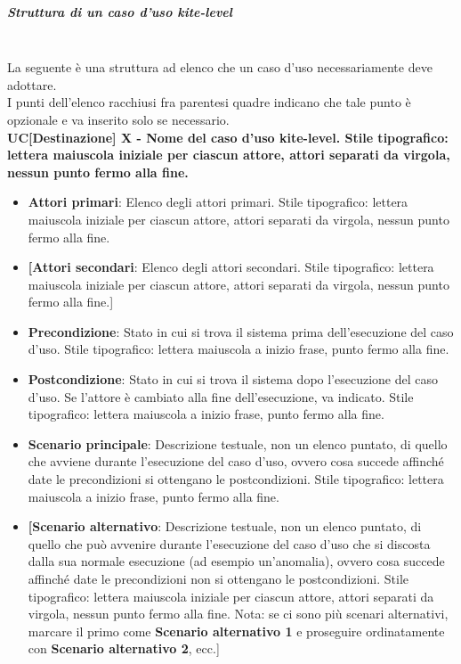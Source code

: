 \subparagraph*{Struttura di un caso d'uso kite-level}\mbox{}\\
La seguente è una struttura ad elenco che un caso d'uso  necessariamente deve adottare.\\
I punti dell'elenco racchiusi fra parentesi quadre indicano che tale punto è opzionale e va inserito solo se necessario.\\
\textbf{UC[Destinazione] X - Nome del caso d'uso kite-level. Stile tipografico: lettera maiuscola iniziale per ciascun attore, attori separati da virgola, nessun punto fermo alla fine.} %
\begin{itemize}
	\item \textbf{Attori primari}: Elenco degli attori primari.
	Stile tipografico: lettera maiuscola iniziale per ciascun attore, attori separati da virgola, nessun punto fermo alla fine.
	\item \textbf{[Attori secondari}: Elenco degli attori secondari.
	Stile tipografico: lettera maiuscola iniziale per ciascun attore, attori separati da virgola, nessun punto fermo alla fine.]
	\item \textbf{Precondizione}: Stato in cui si trova il sistema prima dell'esecuzione del caso d'uso.
	Stile tipografico: lettera maiuscola a inizio frase, punto fermo alla fine.
	\item \textbf{Postcondizione}: Stato in cui si trova il sistema dopo l'esecuzione del caso d'uso.
	Se l'attore è cambiato alla fine dell'esecuzione, va indicato.
	Stile tipografico: lettera maiuscola a inizio frase, punto fermo alla fine.
	\item \textbf{Scenario principale}: Descrizione testuale, non un elenco puntato, di quello che avviene durante l'esecuzione del caso d'uso, ovvero cosa succede affinché date le precondizioni si ottengano le postcondizioni.
	Stile tipografico: lettera maiuscola a inizio frase, punto fermo alla fine.
	\item \textbf{[Scenario alternativo}: Descrizione testuale, non un elenco puntato, di quello che può avvenire durante l'esecuzione del caso d'uso che si discosta dalla sua normale esecuzione (ad esempio un'anomalia), ovvero cosa succede affinché date le precondizioni non si ottengano le postcondizioni.
	Stile tipografico: lettera maiuscola iniziale per ciascun attore, attori separati da virgola, nessun punto fermo alla fine.
	Nota: se ci sono più scenari alternativi, marcare il primo come \textbf{Scenario alternativo 1} e proseguire ordinatamente con \textbf{Scenario alternativo 2}, ecc.]

\end{itemize}
